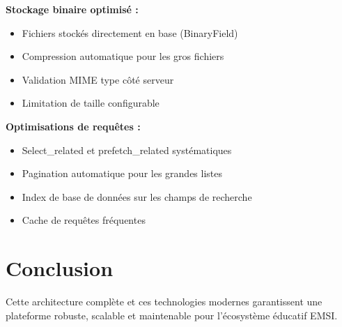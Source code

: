\documentclass[12pt,a4paper]{article}
\begin{document}
\textbf{Stockage binaire optimisé :}
\begin{itemize}
    \item Fichiers stockés directement en base (BinaryField)
    \item Compression automatique pour les gros fichiers
    \item Validation MIME type côté serveur
    \item Limitation de taille configurable
\end{itemize}

\textbf{Optimisations de requêtes :}
\begin{itemize}
    \item Select\_related et prefetch\_related systématiques
    \item Pagination automatique pour les grandes listes
    \item Index de base de données sur les champs de recherche
    \item Cache de requêtes fréquentes
\end{itemize}

\section{Conclusion}

Cette architecture complète et ces technologies modernes garantissent une plateforme robuste, scalable et maintenable pour l'écosystème éducatif EMSI.
\end{document}

